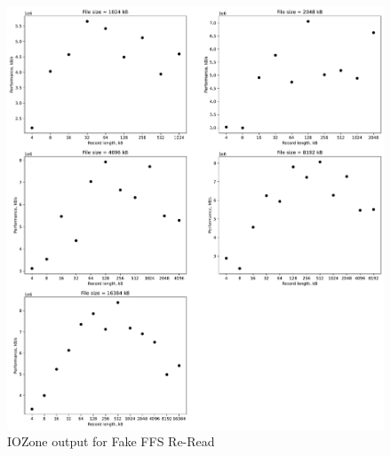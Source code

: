 \begin{figure}[!htb]
	\label{fig:app_bench_fffs_rnd_read}
	\begin{center}
		\includegraphics[width=1.0\textwidth]{figures/benchmarking/fake-ffs/Re-Read.pdf}
	\end{center}
	\caption{IOZone output for Fake FFS Re-Read}
\end{figure}

